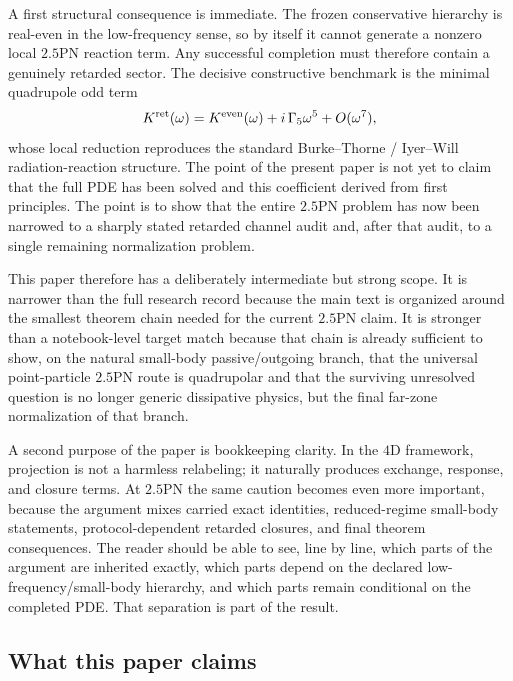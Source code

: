 \documentclass[11pt]{article}
\begin{document}
A first structural consequence is immediate.  The frozen conservative hierarchy
is real-even in the low-frequency sense, so by itself it cannot generate a
nonzero local $2.5$PN reaction term.  Any successful completion must therefore
contain a genuinely retarded sector.  The decisive constructive benchmark is the
minimal quadrupole odd term
\[
K^{\rm ret}(\omega)
=
K^{\rm even}(\omega)+ i\,\Gamma_5\omega^5 + O(\omega^7),
\]
whose local reduction reproduces the standard Burke--Thorne / Iyer--Will
radiation-reaction structure.  The point of the present paper is not yet to
claim that the full PDE has been solved and this coefficient derived from first
principles.  The point is to show that the entire $2.5$PN problem has now been
narrowed to a sharply stated retarded channel audit and, after that audit, to a
single remaining normalization problem.

This paper therefore has a deliberately intermediate but strong scope.  It is
narrower than the full research record because the main text is organized around
the smallest theorem chain needed for the current $2.5$PN claim.  It is stronger
than a notebook-level target match because that chain is already sufficient to
show, on the natural small-body passive/outgoing branch, that the universal
point-particle $2.5$PN route is quadrupolar and that the surviving unresolved
question is no longer generic dissipative physics, but the final far-zone
normalization of that branch.

A second purpose of the paper is bookkeeping clarity.  In the $4$D framework,
projection is not a harmless relabeling; it naturally produces exchange,
response, and closure terms.  At $2.5$PN the same caution becomes even more
important, because the argument mixes carried exact identities, reduced-regime
small-body statements, protocol-dependent retarded closures, and final theorem
consequences.  The reader should be able to see, line by line, which parts of
the argument are inherited exactly, which parts depend on the declared
low-frequency/small-body hierarchy, and which parts remain conditional on the
completed PDE.  That separation is part of the result.

\subsection{What this paper claims}
\label{sec:intro-claims}
\end{document}
